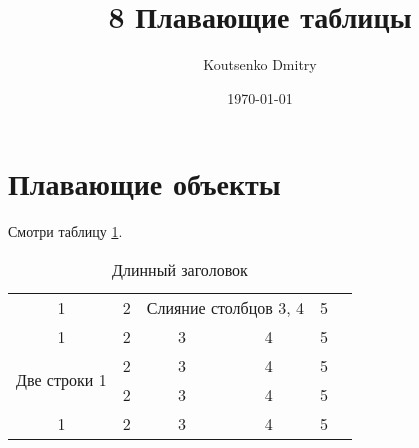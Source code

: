 \documentclass[a4paper,12pt]{article}                       %
\title{8 Плавающие таблицы}
\author{Koutsenko Dmitry}
\date{\today}
\begin{document}

\maketitle

\section{Плавающие объекты}

Смотри таблицу \ref{tab:mytab}.

\begin{table}[!h]
    \begin{center}
        \caption[Краткий заголовок]{Длинный заголовок} \label{tab:mytab}
        \begin{tabular}{|c|c|c|c|c|c|}
            \hline
            1                              & 2 & \multicolumn{2}{|c|}{Слияние столбцов 3, 4} & 5     \\
            \cline{1-3}
            1                              & 2 & 3                                           & 4 & 5 \\
            \hline
            \multirow{2}{*}{Две строки 1 } & 2 & 3                                           & 4 & 5 \\
            \cline{2-5}
                                           & 2 & 3                                           & 4 & 5 \\
            \hline
            1                              & 2 & 3                                           & 4 & 5 \\
            \hline
        \end{tabular}
    \end{center}
\end{table}
\end{document}
